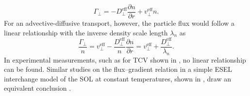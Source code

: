 \begin{equation}
 	\Gamma_\perp = - D_\perp^\textrm{eff} \frac{\partial n}{\partial r} + v_\perp^\textrm{eff} n.
\end{equation}
For an advective-diffusive transport, however, the particle flux would follow a linear relationship with the inverse density scale length $\lambda_n$ \cite{garcia2007turbulent} as
\begin{equation}
	\frac{\Gamma_\perp}{n} =  v_\perp^\textrm{eff} - \frac{D_\perp^\textrm{eff}}{n} \frac{\partial n}{\partial r} = v_\perp^\textrm{eff} + \frac{D_\perp^\textrm{eff}}{\lambda_n}. 
\end{equation} 
In experimental measurements, such as for TCV shown in , no linear relationship can be found. Similar studies on the ﬂux–gradient relation in
a simple ESEL interchange model of the SOL at
constant temperatures, shown in ,  draw an equivalent conclusion \cite{naulin2007turbulent}.


